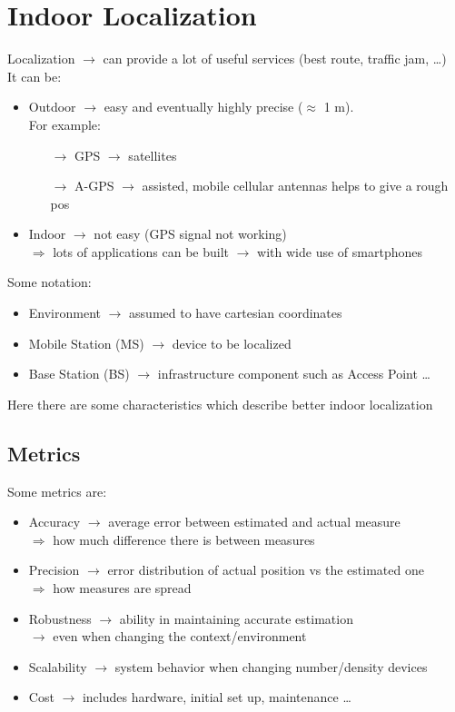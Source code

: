 \section{Indoor Localization}
Localization $\rightarrow$ can provide a lot of useful services (best route, traffic jam,
\dots)\\It can be:
\begin{itemize}
    \item Outdoor $\rightarrow$  easy and eventually highly precise ($\approx$ 1 m).\\
    For example:
    \begin{itemize}
        \item[$\rightarrow$] GPS $\rightarrow$ satellites
        \item[$\rightarrow$] A-GPS $\rightarrow$ assisted, mobile cellular antennas
        helps to give a rough pos
    \end{itemize}
    \item Indoor $\rightarrow$ not easy (GPS signal not working)\\
    $\Rightarrow$ lots of applications can be built $\rightarrow$ with wide use of smartphones
\end{itemize}
Some notation:
\begin{itemize}
    \item Environment $\rightarrow$ assumed to have cartesian coordinates
    \item Mobile Station (MS) $\rightarrow$ device to be localized
    \item Base Station (BS) $\rightarrow$ infrastructure component such as Access Point \dots
\end{itemize}
Here there are some characteristics which describe better indoor localization

\subsection{Metrics}
Some metrics are:
\begin{itemize}
    \item Accuracy $\rightarrow$ average error between estimated
    and actual measure\\
    $\Rightarrow$ how much difference there is between measures
    \item Precision $\rightarrow$ error distribution of actual position
    vs the estimated one\\
    $\Rightarrow$ how measures are spread
    \item Robustness $\rightarrow$ ability in maintaining accurate
    estimation\\$\rightarrow$ even when changing the context/environment
    \item Scalability $\rightarrow$ system behavior when changing 
    number/density devices
    \item Cost $\rightarrow$ includes hardware, initial set up, maintenance
    \dots
\end{itemize}

